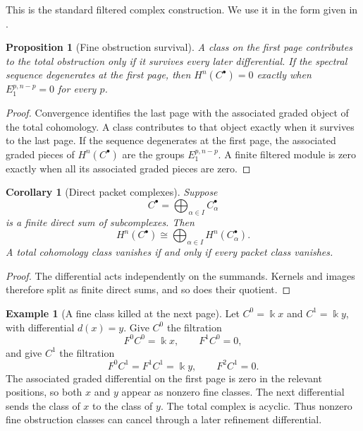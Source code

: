 \documentclass{aomart}
\newtheorem{proposition}[proposition]{Proposition}
\newtheorem{corollary}[corollary]{Corollary}
\theoremstyle{definition}
\newtheorem{example}[example]{Example}
\theoremstyle{remark}
\newcommand{\bbk}{\Bbbk}
\begin{document}
This is the standard filtered complex construction.  We use it in the form given in \cite{Weibel1994,McCleary2001}.

\begin{proposition}[Fine obstruction survival]\label{prop:fine_obstruction_survival}
A class on the first page contributes to the total obstruction only if it survives every later differential.  If the spectral sequence degenerates at the first page, then $H^n(C^\bullet)=0$ exactly when $E_1^{p,n-p}=0$ for every $p$.
\end{proposition}

\begin{proof}
Convergence identifies the last page with the associated graded object of the total cohomology.  A class contributes to that object exactly when it survives to the last page.  If the sequence degenerates at the first page, the associated graded pieces of $H^n(C^\bullet)$ are the groups $E_1^{p,n-p}$.  A finite filtered module is zero exactly when all its associated graded pieces are zero.
\end{proof}

\begin{corollary}[Direct packet complexes]\label{cor:direct_packet_no_cancellation}
Suppose
\[
C^\bullet=\bigoplus_{\alpha\in I}C_\alpha^\bullet
\]
is a finite direct sum of subcomplexes.  Then
\[
H^n(C^\bullet)
\cong
\bigoplus_{\alpha\in I}H^n(C_\alpha^\bullet).
\]
A total cohomology class vanishes if and only if every packet class vanishes.
\end{corollary}

\begin{proof}
The differential acts independently on the summands.  Kernels and images therefore split as finite direct sums, and so does their quotient.
\end{proof}

\begin{example}[A fine class killed at the next page]\label{ex:spectral_cancellation}
Let $C^0=\bbk x$ and $C^1=\bbk y$, with differential $d(x)=y$.  Give $C^0$ the filtration
\[
F^0C^0=\bbk x,
\qquad
F^1C^0=0,
\]
and give $C^1$ the filtration
\[
F^0C^1=F^1C^1=\bbk y,
\qquad
F^2C^1=0.
\]
The associated graded differential on the first page is zero in the relevant positions, so both $x$ and $y$ appear as nonzero fine classes.  The next differential sends the class of $x$ to the class of $y$.  The total complex is acyclic.  Thus nonzero fine obstruction classes can cancel through a later refinement differential.
\end{example}
\end{document}
